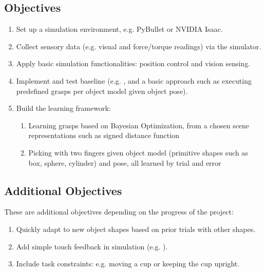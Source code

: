 \documentclass{article}
\begin{document}
\subsection{Objectives}
\begin{enumerate}
    \item Set up a simulation environment, e.g. PyBullet or NVIDIA Isaac. 
    \item Collect sensory data (e.g. visual and force/torque readings) via the simulator.
    \item Apply basic simulation functionalities: position control and vision sensing.
    \item Implement and test baseline (e.g. \cite{breyer}, and a basic approach such as executing predefined grasps per object model given object pose).
    \item Build the learning framework:
    \begin{enumerate}
        \item Learning grasps based on Bayesian Optimization, from a chosen scene representations such as signed distance function 
        \item Picking with two fingers given object model (primitive shapes such as box, sphere, cylinder) and pose, all learned by trial and error
    \end{enumerate}
\end{enumerate}

\subsection{Additional Objectives}
These are additional objectives depending on the progress of the project:
\begin{enumerate}
    \item Quickly adapt to new object shapes based on prior trials with other shapes.
    \item Add simple touch feedback in simulation (e.g. \cite{bekiroglu}).
    \item Include task constraints: e.g. moving a cup or keeping the cup upright.
\end{enumerate}
\end{document}
